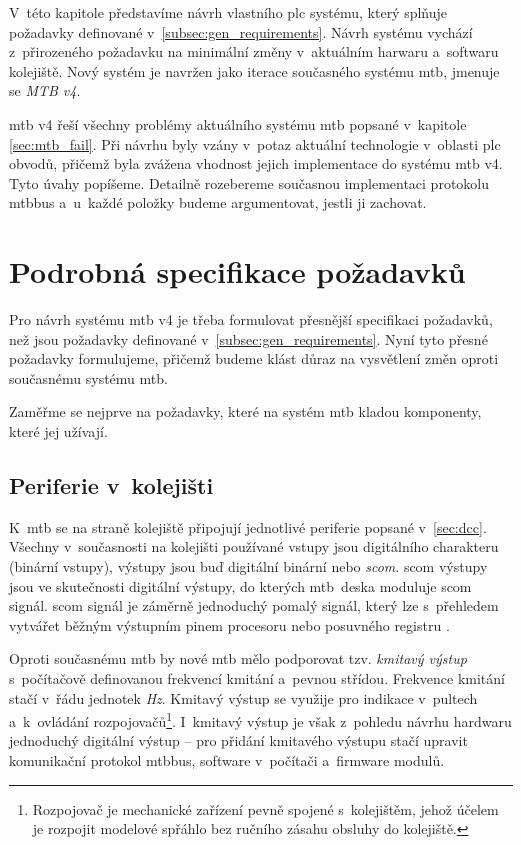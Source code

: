 V~této kapitole představíme návrh vlastního \gls{plc} systému, který
splňuje požadavky definované v~\ref{subsec:gen_requirements}. Návrh systému
vychází z~přirozeného požadavku na minimální změny v~aktuálním harwaru
a~softwaru kolejiště. Nový systém je navržen jako iterace současného systému
\gls{mtb}, jmenuje se \textit{MTB v4}.

\gls{mtb} v4 řeší všechny problémy aktuálního systému \gls{mtb} popsané
v~kapitole \ref{sec:mtb_fail}. Při návrhu byly vzány v~potaz aktuální
technologie v~oblasti \gls{plc} obvodů, přičemž byla zvážena vhodnost jejich
implementace do systému \gls{mtb} v4. Tyto úvahy popíšeme. Detailně rozebereme
současnou implementaci protokolu \gls{mtbbus} a~u~každé položky budeme
argumentovat, jestli ji zachovat.

\section{Podrobná specifikace požadavků}

Pro návrh systému \gls{mtb} v4 je třeba formulovat přesnější specifikaci
požadavků, než jsou požadavky definované v~\ref{subsec:gen_requirements}. Nyní
tyto přesné požadavky formulujeme, přičemž budeme klást důraz na vysvětlení
změn oproti současnému systému \gls{mtb}.

Zaměřme se nejprve na požadavky, které na systém \gls{mtb} kladou komponenty,
které jej užívají.

\subsection{Periferie v~kolejišti}

K~\gls{mtb} se na straně kolejiště připojují jednotlivé periferie popsané
v~\ref{sec:dcc}. Všechny v~současnosti na kolejišti používané vstupy jsou
digitálního charakteru (binární vstupy), výstupy jsou buď digitální binární
nebo \textit{\gls{scom}}. \gls{scom} výstupy jsou ve skutečnosti digitální
výstupy, do kterých \gls{mtb} deska moduluje \gls{scom} signál. \gls{scom}
signál je záměrně jednoduchý pomalý signál, který lze s~přehledem vytvářet
běžným výstupním pinem procesoru nebo posuvného registru \cite{scom-specs}.

Oproti současnému \gls{mtb} by nové \gls{mtb} mělo podporovat tzv. \textit{kmitavý
výstup} s~počítačově definovanou frekvencí kmitání a~pevnou střídou. Frekvence
kmitání stačí v~řádu jednotek \textit{Hz}. Kmitavý výstup se využije pro
indikace v~pultech a~k~ovládání rozpojovačů\footnote{Rozpojovač je mechanické
zařízení pevně spojené s~kolejištěm, jehož účelem je rozpojit modelové spřáhlo
bez ručního zásahu obsluhy do kolejiště.}. I~kmitavý výstup je však z~pohledu
návrhu hardwaru jednoduchý digitální výstup – pro přidání kmitavého výstupu
stačí upravit komunikační protokol \gls{mtbbus}, software v~počítači a~firmware
modulů.


